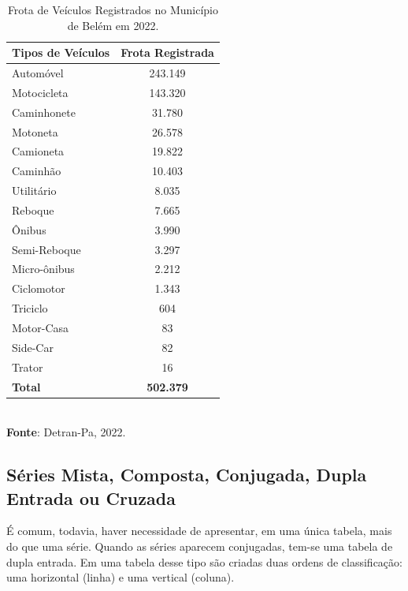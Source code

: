 \begin{table}[!htb]
    \centering
    {
    \caption{Frota de Veículos Registrados no Município de Belém em 2022.}
    \label{obitos2}
    \vspace{0.1cm}
\begin{tabular}{l|c}
\hline\hline
\textbf{Tipos de Veículos}   & \textbf{Frota Registrada} \\
\hline\hline
Automóvel     &  243.149 \\
Motocicleta   &  143.320 \\
Caminhonete   &  31.780  \\
Motoneta      &  26.578  \\
Camioneta     &  19.822  \\
Caminhão      &  10.403   \\
Utilitário    &  8.035   \\
Reboque       &  7.665   \\ 
Ônibus        &  3.990   \\
Semi-Reboque  &  3.297   \\
Micro-ônibus  &  2.212   \\
Ciclomotor    &  1.343   \\
Triciclo      &  604     \\
Motor-Casa    &  83      \\
Side-Car      &  82      \\
Trator        &  16      \\
\hline\hline
\textbf{Total}         & \textbf{502.379}   \\
\hline\hline
\end{tabular}}
\\
\hspace{-2.6cm} 
\textbf{Fonte}: Detran-Pa, 2022. \\ 
\end{table}





\newpage
\subsection{Séries Mista, Composta, Conjugada, Dupla Entrada ou Cruzada}


\inic É comum, todavia, haver necessidade de apresentar, em uma única tabela, mais do que uma série. Quando as séries aparecem conjugadas, tem-se uma tabela de dupla entrada. Em uma tabela desse tipo são criadas duas ordens de classificação: uma horizontal (linha) e uma vertical (coluna).



